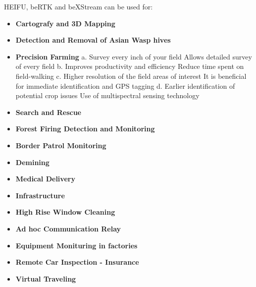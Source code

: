 HEIFU, beRTK and beXStream can be used for:
\begin{itemize}
    \item \textbf{Cartografy and 3D Mapping}
    \item \textbf{Detection and Removal of Asian Wasp hives}
    \item \textbf{Precision Farming}
        a. Survey every inch of your field
            Allows detailed survey of every field
        b. Improves productivity and efficiency 
            Reduce time spent on field-walking
        c. Higher resolution of the field areas of interest 
            It is beneficial for immediate identification and GPS tagging
        d. Earlier identification of potential crop issues
            Use of multispectral sensing technology
    \item \textbf{Search and Rescue}
    \item \textbf{Forest Firing Detection and Monitoring}
    \item \textbf{Border Patrol Monitoring}
    \item \textbf{Demining}
    \item \textbf{Medical Delivery}
    \item \textbf{Infrastructure}
    \item \textbf{High Rise Window Cleaning}
    \item \textbf{Ad hoc Communication Relay}
    \item \textbf{Equipment Monituring in factories}
    \item \textbf{Remote Car Inspection - Insurance}
    \item \textbf{Virtual Traveling}
\end{itemize}
